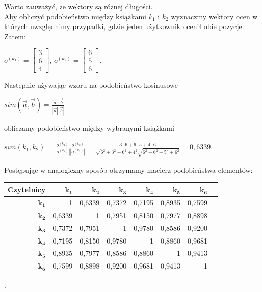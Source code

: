 \documentclass[12pt,a4paper]{report}
\begin{document}
Warto zauważyć, że wektory są różnej długości.
\\Aby obliczyć podobieństwo między książkami $k_1$ i $k_2$ wyznaczmy wektory ocen w których uwzględnimy przypadki, gdzie jeden użytkownik ocenił obie pozycje.
\\Zatem:
\begin{center}
$\overline{o^{(k_1)}} = \left[
        \begin{array}{c}
         3 \\
         6 \\
         4
         \end{array}
      \right]$, $\overline{o^{(k_2)}} = \left[
        \begin{array}{c}
         6 \\
         5 \\
         6
         \end{array}
      \right]$.
\end{center}
Następnie używając wzoru na podobieństwo kosinusowe
\begin{center}
$sim(\overrightarrow{a},\overrightarrow{b}) = \frac{\overrightarrow{a} \cdot \overrightarrow{b}}{|\overrightarrow{a}||\overrightarrow{b}|}$ 
\end{center}
obliczamy podobieństwo między wybranymi książkami
\begin{center}
$sim(k_1,k_2) = \frac{\overline{o^{(k_1)}} \cdot \overline{o^{(k_2)}}}{|o^{(k_1)}||o^{(k_2)}|} = \frac{3 \cdot 6 + 6 \cdot 5 + 4 \cdot 6}{\sqrt{6^2 + 3^2 + 6^2 + 4^2} \sqrt{6^2 + 6^2 + 5^2 + 6^2}} = 0,6339$.
\end{center}
Postępując w analogiczny sposób otrzymamy macierz podobieństwa elementów:
\begin{center}
\begin{tabular}{|r|r|r|r|r|r|r|r|} \hline
\textbf{Czytelnicy} & $\mathbf{k_1}$ & $\mathbf{k_2}$ & $\mathbf{k_3}$ & $\mathbf{k_4}$ & $\mathbf{k_5}$ & $\mathbf{k_6}$ \\
\hline
$\mathbf{k_1}$ & 1 & 0,6339 & 0,7372 & 0,7195 & 0,8935 & 0,7599 \\
\hline
$\mathbf{k_2}$ & 0,6339 & 1 & 0,7951 & 0,8150 & 0,7977 & 0,8898 \\
\hline
$\mathbf{k_3}$ & 0,7372 & 0,7951 & 1 & 0,9780 & 0,8586 & 0,9200 \\
\hline
$\mathbf{k_4}$ & 0,7195 & 0,8150 & 0,9780 & 1 & 0,8860 & 0,9681 \\
\hline 
$\mathbf{k_5}$ & 0,8935 & 0,7977 & 0,8586 & 0,8860 & 1 & 0,9413 \\
\hline 
$\mathbf{k_6}$ & 0,7599 & 0,8898 & 0,9200 & 0,9681 & 0,9413 & 1 \\
\hline 
\end{tabular}.
\end{center}
\end{document}
